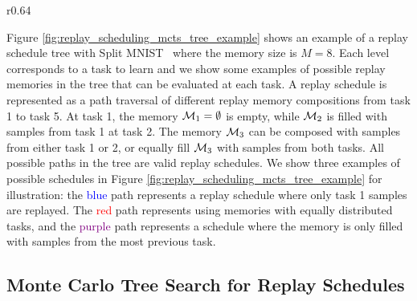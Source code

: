 \begin{wrapfigure}{r}{0.64\textwidth}
	\centering
	\setlength{\figwidth}{.64\textwidth}
	\setlength{\figheight}{.27\textheight}
	\vspace{-3mm}
	
	\vspace{-5mm}
	\caption{Tree-shaped action space of possible replay memories of size $M=8$ at every task for Split MNIST.
		}
		\vspace{-3mm}
		\label{fig:replay_scheduling_mcts_tree_example}
	\end{wrapfigure}
	Figure \ref{fig:replay_scheduling_mcts_tree_example} shows an example of a replay schedule tree with Split MNIST~ 
	where the memory size is $M=8$. Each level corresponds to a task to learn and we show some examples of possible replay memories in the tree that can be evaluated at each task. A replay schedule is represented as a path traversal of different replay memory compositions from task 1 to task 5. At task 1, the memory ${\mathcal{M}}_1 = \emptyset$ is empty, while ${\mathcal{M}}_2$ is filled with samples from task 1 at task 2. The memory ${\mathcal{M}}_3$ can be composed with samples from either task 1 or 2, or equally fill ${\mathcal{M}}_3$ with samples from both tasks. All possible paths in the tree are valid replay schedules. We show three examples of possible schedules in Figure \ref{fig:replay_scheduling_mcts_tree_example} for illustration: the \textcolor{blue}{blue} path represents a replay schedule where only task 1 samples are replayed. The \textcolor{red}{red} path represents using memories with equally distributed tasks, and the \textcolor{purple}{purple} path represents a schedule where the memory is only filled with samples from the most previous task.




%
\subsection{Monte Carlo Tree Search for Replay Schedules}
\label{paperC:sec:mcts_for_replay_scheduling}


